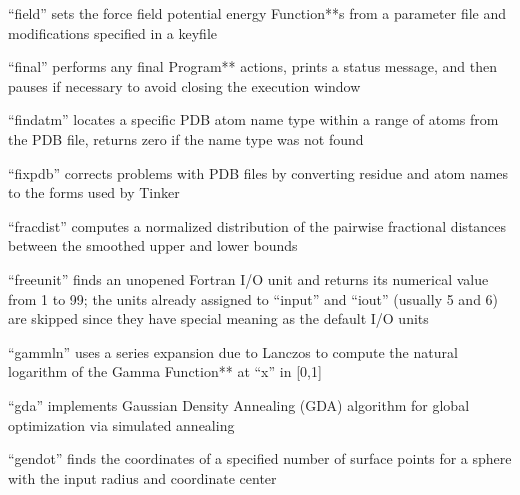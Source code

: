 \documentclass[letterpaper,11pt,english]{sphinxmanual}
\begin{document}



“field” sets the force field potential energy Function**s from a parameter file and modifications specified in a keyfile


“final” performs any final Program** actions, prints a status message, and then pauses if necessary to avoid closing the execution window


“findatm” locates a specific PDB atom name type within a range of atoms from the PDB file, returns zero if the name type was not found


“fixpdb” corrects problems with PDB files by converting residue and atom names to the forms used by Tinker


“fracdist” computes a normalized distribution of the pairwise fractional distances between the smoothed upper and lower bounds


“freeunit” finds an unopened Fortran I/O unit and returns its numerical value from 1 to 99; the units already assigned to “input” and “iout” (usually 5 and 6) are skipped since they have special meaning as the default I/O units


“gammln” uses a series expansion due to Lanczos to compute the natural logarithm of the Gamma Function** at “x” in {[}0,1{]}


“gda” implements Gaussian Density Annealing (GDA) algorithm for global optimization via simulated annealing






“gendot” finds the coordinates of a specified number of surface points for a sphere with the input radius and coordinate center
\end{document}
